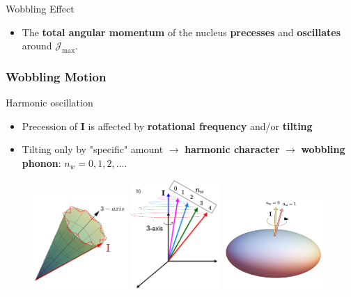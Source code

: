 \documentclass{beamer}
\begin{document}
\begin{frame}
\begin{columns}
\begin{column}{0.45\textwidth}
\begin{figure}
			\end{figure}
		\end{column}
	\end{columns}
	\vspace{-0.4cm}
	\begin{alertblock}{Wobbling Effect}
		\begin{itemize}
			\item The \textbf{total angular momentum} of the nucleus \textbf{precesses} and \textbf{oscillates} around $\mathcal{J}_\text{max}$.
		\end{itemize}
	\end{alertblock}
\end{frame}


\begin{frame}
	\frametitle{Wobbling Motion}
	\begin{exampleblock}{Harmonic oscillation}
		\begin{itemize}
			\item Precession of $\mathbf{I}$ is affected by \textbf{rotational frequency} and/or \textbf{tilting}
			\item Tilting only by "specific" amount $\rightarrow$ \textbf{harmonic character} $\rightarrow$ \textbf{wobbling phonon}: $n_w=0,1,2,\dots$.
		\end{itemize}
	\end{exampleblock}
	\begin{figure}
		\includegraphics[width=0.32\textwidth]{figures/precessional_cone_2.pdf}
		\includegraphics[width=0.3\textwidth]{figures/wobbling_n_schematic-2.pdf}
		\includegraphics[width=0.34\textwidth]{figures/triaxial-shapes-even-A.pdf}
	\end{figure}
\end{frame}
\end{document}

